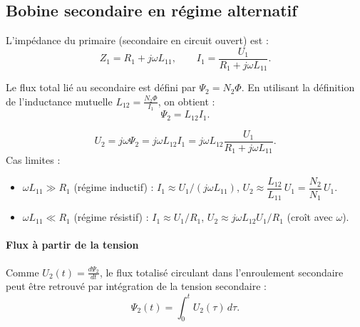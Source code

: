 \subsection{Bobine secondaire en régime alternatif}
\label{sec:BobSecAC}
L'impédance du primaire (secondaire en circuit ouvert) est :
\[
Z_1=R_1+j\omega L_{11}, \qquad I_1=\frac{U_1}{R_1+j\omega L_{11}}.
\]

Le flux total lié au secondaire est défini par $\Psi_2 = N_2 \Phi$. En utilisant la définition de l'inductance mutuelle $L_{12} = \frac{N_2 \Phi}{I_1}$, on obtient :
\[
\Psi_2 = L_{12} I_1.
\]

\[
U_2 = j \omega \Psi_2 = j\omega L_{12}I_1=j\omega L_{12}\frac{U_1}{R_1+j\omega L_{11}}.
\]
Cas limites :
\begin{itemize}
\item \(\omega L_{11}\gg R_1\) (régime inductif) :
  \(I_1\approx U_1/(j\omega L_{11})\),\quad
  \(U_2\approx \dfrac{L_{12}}{L_{11}}\,U_1= \dfrac{N_2}{N_1}\,U_1\).
\item \(\omega L_{11}\ll R_1\) (régime résistif) :
  \(I_1\approx U_1/R_1\),\quad
  \(U_2\approx j\omega L_{12}U_1/R_1\) (croît avec \(\omega\)).
\end{itemize}

\paragraph{Flux à partir de la tension}
Comme $U_2(t) = \frac{d\Psi_2}{dt}$, le flux totalisé circulant dans l’enroulement secondaire peut être retrouvé par intégration de la tension secondaire :
\[
\Psi_2(t)=\int_0^t U_2(\tau)\,d\tau.
\]
\newpage
